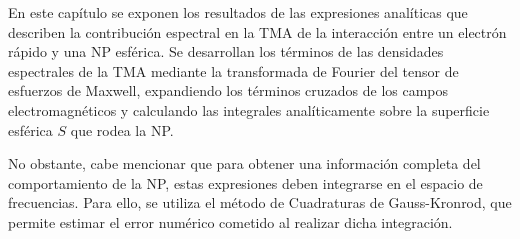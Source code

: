 \label{cap: resultados}

En este capítulo se exponen los resultados de las expresiones analíticas que describen la contribución espectral en la TMA de la interacción entre un electrón rápido y una NP esférica. Se desarrollan los términos de las densidades espectrales de la TMA mediante la transformada de Fourier del tensor de esfuerzos de Maxwell, expandiendo los términos cruzados de los campos electromagnéticos y calculando las integrales analíticamente sobre la superficie esférica $S$ que rodea la NP.

No obstante, cabe mencionar que para obtener una información completa del comportamiento de la NP, estas expresiones deben integrarse en el espacio de frecuencias. Para ello, se utiliza el método de Cuadraturas de Gauss-Kronrod, que permite estimar el error numérico cometido al realizar dicha integración.

